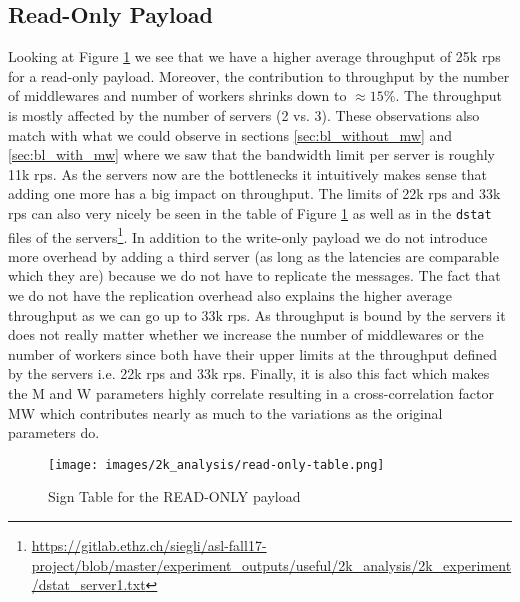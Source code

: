 \documentclass[11pt,a4paper]{article}
\let\tt\texttt
\begin{document}
\subsection{Read-Only Payload}
Looking at Figure \ref{img:2k:ro} we see that we have a higher average throughput of 25k rps for a read-only payload. Moreover, the contribution to throughput by the number of middlewares and number of workers shrinks down to $\approx 15\%$. The throughput is mostly affected by the number of servers (2 vs. 3). These observations also match with what we could observe in sections \ref{sec:bl_without_mw} and \ref{sec:bl_with_mw} where we saw that the bandwidth limit per server is roughly 11k rps. As the servers now are the bottlenecks it intuitively makes sense that adding one more has a big impact on throughput. The limits of 22k rps and 33k rps can also very nicely be seen in the table of Figure \ref{img:2k:ro} as well as in the \tt{dstat} files of the servers\footnote{\url{https://gitlab.ethz.ch/siegli/asl-fall17-project/blob/master/experiment_outputs/useful/2k_analysis/2k_experiment/dstat_server1.txt}}. In addition to the write-only payload we do not introduce more overhead by adding a third server (as long as the latencies are comparable which they are) because we do not have to replicate the messages. The fact that we do not have the replication overhead also explains the higher average throughput as we can go up to 33k rps. As throughput is bound by the servers it does not really matter whether we increase the number of middlewares or the number of workers since both have their upper limits at the throughput defined by the servers i.e. 22k rps and 33k rps. Finally, it is also this fact which makes the M and W parameters highly correlate resulting in a cross-correlation factor MW which contributes nearly as much to the variations as the original parameters do.

\begin{figure}[H]
    \centering
    \texttt{[image: images/2k\_analysis/read-only-table.png]}
    \caption{Sign Table for the READ-ONLY payload}
    \label{img:2k:ro}
\end{figure}
\end{document}
